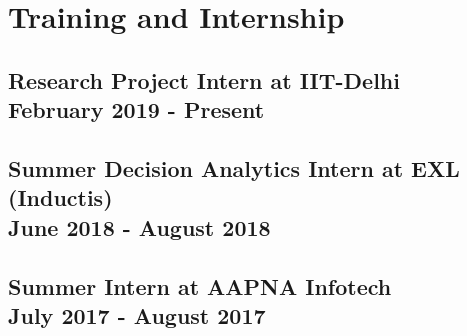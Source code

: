 \documentclass{article}
\begin{document}
\section{Training and Internship}
\subsection{Research Project Intern at IIT-Delhi\\February 2019 - Present}
\subsection{Summer Decision Analytics Intern at EXL (Inductis)\\June 2018 - August 2018}
\subsection{Summer Intern at AAPNA Infotech \\ July 2017 - August 2017}
\end{document}
